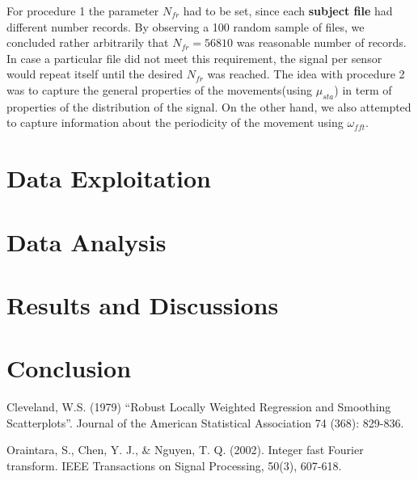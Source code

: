  For procedure 1 the parameter $N_{fr}$ had to be set, since each \textbf{subject file} had different number records. By observing a 100 random sample of files, we concluded rather arbitrarily that  $N_{fr}=56810$  was reasonable number of records. In case a particular file did not meet this requirement, the signal per sensor would repeat itself until the desired $N_{fr}$ was reached. The idea with procedure 2 was to capture the general properties of the movements(using $\mu_{sta}$) in term of properties of the distribution of the signal. On the other hand, we also attempted to capture information about the periodicity of the movement using $\omega_{fft}$. 


\section{Data Exploitation}

\section{Data Analysis}

\section{Results and Discussions}

\section{Conclusion}



\begin{thebibliography}{1}
Cleveland, W.S. (1979) “Robust Locally Weighted Regression and Smoothing Scatterplots”. Journal of the American Statistical Association 74 (368): 829-836.

Oraintara, S., Chen, Y. J., \& Nguyen, T. Q. (2002). Integer fast Fourier transform. IEEE Transactions on Signal Processing, 50(3), 607-618.

\end{thebibliography}

